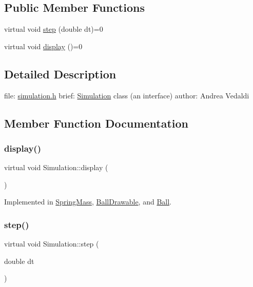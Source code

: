 \subsection*{Public Member Functions}
\begin{DoxyCompactItemize}
\item 
virtual void \hyperlink{classSimulation_a1040e261c063e307871fb1dfe664fb0a}{step} (double dt)=0
\item 
virtual void \hyperlink{classSimulation_a6f8e5272dbb5dea34970f0695419ff03}{display} ()=0
\end{DoxyCompactItemize}


\subsection{Detailed Description}
file\+: \hyperlink{simulation_8h}{simulation.\+h} brief\+: \hyperlink{classSimulation}{Simulation} class (an interface) author\+: Andrea Vedaldi 

\subsection{Member Function Documentation}
\mbox{\label{classSimulation_a6f8e5272dbb5dea34970f0695419ff03}} 
\subsubsection{\texorpdfstring{display()}{display()}}
{\footnotesize\ttfamily virtual void Simulation\+::display (\begin{DoxyParamCaption}{ }\end{DoxyParamCaption})\hspace{0.3cm}{\ttfamily [pure virtual]}}



Implemented in \hyperlink{classSpringMass_a97dc8e01e829e466198b3a8c201a5b13}{Spring\+Mass}, \hyperlink{classBallDrawable_a934809e648474de989666d41a34a880e}{Ball\+Drawable}, and \hyperlink{classBall_a4a575db97fe36b3caa001ade4affeb18}{Ball}.

\mbox{\label{classSimulation_a1040e261c063e307871fb1dfe664fb0a}} 
\subsubsection{\texorpdfstring{step()}{step()}}
{\footnotesize\ttfamily virtual void Simulation\+::step (\begin{DoxyParamCaption}\item[{double}]{dt }\end{DoxyParamCaption})\hspace{0.3cm}{\ttfamily [pure virtual]}}




